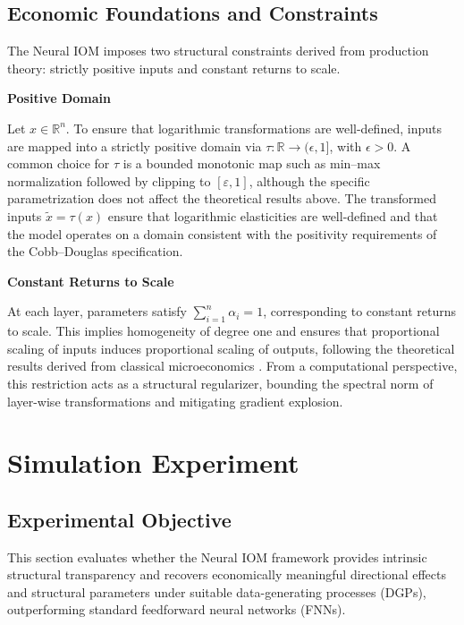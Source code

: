 \documentclass[preprint,12pt,authoryear]{sn-jnl}
\begin{document}
\subsection{Economic Foundations and Constraints} \label{sec:economic_constraints}

The Neural IOM imposes two structural constraints derived from production theory: strictly positive inputs and constant returns to scale.

\textbf{Positive Domain}

Let $x \in \mathbb{R}^n$. To ensure that logarithmic transformations are well-defined, inputs are mapped into a strictly positive domain via $\tau: \mathbb{R} \to (\epsilon,1]$, with $\epsilon > 0$. A common choice for $\tau$ is a bounded monotonic map such as min--max normalization followed by clipping to $[\varepsilon,1]$, although the specific parametrization does not affect the theoretical results above. The transformed inputs $\tilde{x} = \tau(x)$ ensure that logarithmic elasticities are well-defined and that the model operates on a domain consistent with the positivity requirements of the Cobb--Douglas specification.

\textbf{Constant Returns to Scale}

At each layer, parameters satisfy $\sum_{i=1}^n \alpha_i = 1$, corresponding to constant returns to scale. This implies homogeneity of degree one and ensures that proportional scaling of inputs induces proportional scaling of outputs, following the theoretical results derived from classical microeconomics \citep{mas1995microeconomic}. From a computational perspective, this restriction acts as a structural regularizer, bounding the spectral norm of layer-wise transformations and mitigating gradient explosion.

\section{Simulation Experiment} \label{sec:simulation}

\subsection{Experimental Objective}

This section evaluates whether the Neural IOM framework provides intrinsic structural transparency and recovers economically meaningful directional effects and structural parameters under suitable data-generating processes (DGPs), outperforming standard feedforward neural networks (FNNs). 
\end{document}
